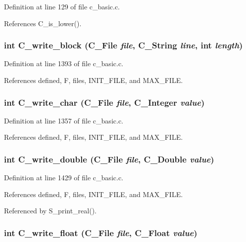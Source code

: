 Definition at line 129 of file c\_\-basic.c.

References C\_\-is\_\-lower().
\subsubsection{\setlength{\rightskip}{0pt plus 5cm}int C\_\-write\_\-block (\bf{C\_\-File} {\em file}, \bf{C\_\-String} {\em line}, int {\em length})}\label{c__basic_8c_2f6edac31d6e2a9411525563dcc32e0b}




Definition at line 1393 of file c\_\-basic.c.

References defined, F, files, INIT\_\-FILE, and MAX\_\-FILE.
\subsubsection{\setlength{\rightskip}{0pt plus 5cm}int C\_\-write\_\-char (\bf{C\_\-File} {\em file}, \bf{C\_\-Integer} {\em value})}\label{c__basic_8c_2b2dfd94e2065f0c0abc67de22f84576}




Definition at line 1357 of file c\_\-basic.c.

References defined, F, files, INIT\_\-FILE, and MAX\_\-FILE.
\subsubsection{\setlength{\rightskip}{0pt plus 5cm}int C\_\-write\_\-double (\bf{C\_\-File} {\em file}, \bf{C\_\-Double} {\em value})}\label{c__basic_8c_60d6e926e0dd64a162327c233d3ed481}




Definition at line 1429 of file c\_\-basic.c.

References defined, F, files, INIT\_\-FILE, and MAX\_\-FILE.

Referenced by S\_\-print\_\-real().
\subsubsection{\setlength{\rightskip}{0pt plus 5cm}int C\_\-write\_\-float (\bf{C\_\-File} {\em file}, \bf{C\_\-Float} {\em value})}\label{c__basic_8c_e968b8e21a15ed10bd9703c0f9415790}




